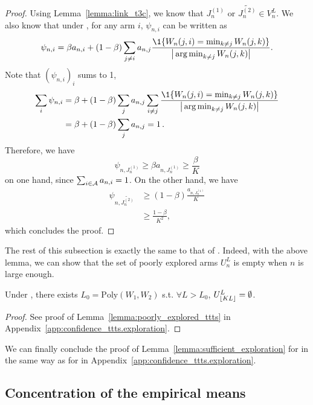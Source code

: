 \begin{proof}
    Using Lemma~\ref{lemma:link_t3c}, we know that $J_n^{(1)}$ or $\tilde{J_n^{(2)}} \in V_n^L$. We also know that under \TCC, for any arm $i$, $\psi_{n,i}$ can be written as
    \[
        \psi_{n,i} = \beta a_{n,i} + (1-\beta) \sum_{j\neq i} a_{n,j}\frac{\1\{W_n(j,i)=\min_{k\neq j} W_n(j,k)\}}{\big|\argmin_{k\neq j } W_n(j,k)\big|}.
    \]
    Note that $(\psi_{n,i})_i$ sums to 1,
    \begin{align*}
        \sum_i  \psi_{n,i} &= \beta +(1-\beta) \sum_j a_{n,j} \sum_{i\neq j } \frac{\1\{W_n(j,i)=\min_{k\neq j} W_n(j,k)\}}{\big|\argmin_{k\neq j } W_n(j,k)\big|}\\
        &= \beta +(1-\beta) \sum_j a_{n,j} =1\,.
    \end{align*}
    Therefore, we have
    \[
        \psi_{n,J_n^{(1)}} \geq \beta a_{n,J_n^{(1)}} \geq \frac{\beta}{K}
    \]
    on one hand, since $\sum_{i\in\mathcal{A}} a_{n,i} = 1$. On the other hand, we have
    \begin{align*}
        \psi_{n,\tilde{J_n^{(2)}}} &\geq (1-\beta) \frac{a_{n,J_n^{(1)}}}{K}\\
                           &\geq \frac{1-\beta}{K^2},
    \end{align*}
    which concludes the proof.
\end{proof}

The rest of this subsection is exactly the same to that of \TTTS. Indeed, with the above lemma, we can show that the set of poorly explored arms $U_n^L$ is empty when $n$ is large enough.

\begin{lemma}\label{lemma:poorly_explored_t3c}
    Under \TCC, there exists $L_0 = \text{Poly}(W_1,W_2)$ s.t. $\forall L > L_0$, $U_{\lfloor KL\rfloor}^L = \emptyset$.
\end{lemma}

\begin{proof}
    See proof of Lemma~\ref{lemma:poorly_explored_ttts} in Appendix~\ref{app:confidence_ttts.exploration}.
\end{proof}

We can finally conclude the proof of Lemma~\ref{lemma:sufficient_exploration} for \TCC in the same way as for \TTTS in Appendix~\ref{app:confidence_ttts.exploration}.
\hfill\BlackBox\\[2mm]

\subsection{Concentration of the empirical means}\label{app:confidence_t3c.means}

